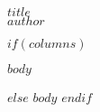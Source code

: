 \documentclass[10pt,a5paper,twoside]{article}
\begin{document}
\thispagestyle{empty}

\begin{center}
\rmfamily\bfseries\Huge{$title$} \\
\vspace{5mm}
\rmfamily\bfseries\large{$author$} \\
\end{center}

\newpage


\singlespacing

$if(columns)$
\setlength{\columnsep}{5em}
\begin{multicols*}{2}
$body$
\end{multicols*}

$else$
$body$
$endif$
\end{document}
